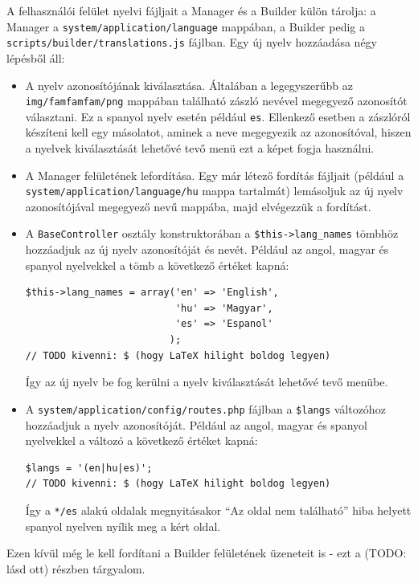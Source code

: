 \documentclass[12pt,a4paper,twoside]{article}
\begin{document}
A felhasználói felület nyelvi fájljait a Manager és a Builder külön tárolja: a
Manager a \texttt{system/application/language} mappában, a Builder pedig a
\texttt{scripts/builder/translations.js} fájlban. Egy új nyelv hozzáadása négy
lépésből áll:

\begin{itemize}
  \item A nyelv azonosítójának kiválasztása. Általában a legegyszerűbb az
    \texttt{img/famfamfam/png} mappában található zászló nevével megegyező
    azonosítót választani. Ez a spanyol nyelv esetén például
    \texttt{es}. Ellenkező esetben a zászlóról készíteni kell egy
    másolatot, aminek a neve megegyezik az azonosítóval, hiszen a nyelvek
    kiválasztását lehetővé tevő menü ezt a képet fogja használni.
  \item A Manager felületének lefordítása. Egy már létező fordítás fájljait
    (például a \texttt{system/application/language/hu} mappa tartalmát)
    lemásoljuk az új nyelv azonosítójával megegyező nevű mappába, majd
    elvégezzük a fordítást.
  \item A \texttt{BaseController} osztály konstruktorában a
    \texttt{\$this->lang\_names} tömbhöz hozzáadjuk az új nyelv azonosítóját és
    nevét. Például az angol, magyar és spanyol nyelvekkel a tömb a következő
    értéket kapná:
    \begin{lstlisting}[firstnumber=35]
$this->lang_names = array('en' => 'English',
                          'hu' => 'Magyar',
                          'es' => 'Espanol'
                         );
// TODO kivenni: $ (hogy LaTeX hilight boldog legyen)
    \end{lstlisting}
    Így az új nyelv be fog kerülni a nyelv kiválasztását lehetővé tevő menübe.
  \item A \texttt{system/application/config/routes.php} fájlban a
    \texttt{\$langs} változóhoz hozzáadjuk a nyelv azonosítóját. Például az
    angol, magyar és spanyol nyelvekkel a változó a következő értéket kapná:
    \begin{lstlisting}[firstnumber=46]
$langs = '(en|hu|es)';
// TODO kivenni: $ (hogy LaTeX hilight boldog legyen)
    \end{lstlisting}
    Így a \texttt{*/es} alakú oldalak megnyitásakor ``Az oldal nem található''
    hiba helyett spanyol nyelven nyílik meg a kért oldal.

\end{itemize}

Ezen kívül még le kell fordítani a Builder felületének üzeneteit is - ezt a
(TODO: lásd ott) részben tárgyalom.
\end{document}
